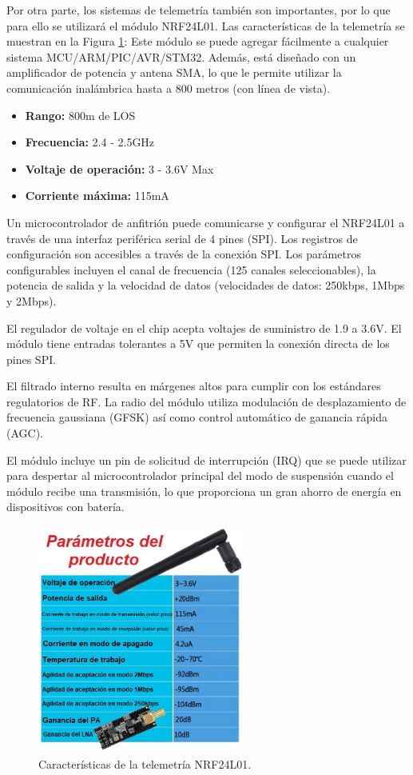 \noindent Por otra parte, los sistemas de telemetría también son importantes, por lo que para ello se utilizará el módulo NRF24L01. Las características de la telemetría se muestran en la Figura \ref{fig:nrf}:
\noindent Este módulo se puede agregar fácilmente a cualquier sistema MCU/ARM/PIC/AVR/STM32. Además, está diseñado con un amplificador de potencia y antena SMA, lo que le permite utilizar la comunicación inalámbrica hasta a 800 metros (con línea de vista).
\begin{itemize}[itemsep=0pt, parsep=0pt, topsep=0pt, partopsep=0pt]
    \item \textbf{Rango:} 800m de LOS
    \item \textbf{Frecuencia:} 2.4 - 2.5GHz
    \item \textbf{Voltaje de operación:} 3 - 3.6V Max
    \item \textbf{Corriente máxima:} 115mA
\end{itemize}

\noindent Un microcontrolador de anfitrión puede comunicarse y configurar el NRF24L01 a través de una interfaz periférica serial de 4 pines (SPI). Los registros de configuración son accesibles a través de la conexión SPI. Los parámetros configurables incluyen el canal de frecuencia (125 canales seleccionables), la potencia de salida y la velocidad de datos (velocidades de datos: 250kbps, 1Mbps y 2Mbps).

\noindent El regulador de voltaje en el chip acepta voltajes de suministro de 1.9 a 3.6V. El módulo tiene entradas tolerantes a 5V que permiten la conexión directa de los pines SPI.

\noindent El filtrado interno resulta en márgenes altos para cumplir con los estándares regulatorios de RF. La radio del módulo utiliza modulación de desplazamiento de frecuencia gaussiana (GFSK) así como control automático de ganancia rápida (AGC).

\noindent El módulo incluye un pin de solicitud de interrupción (IRQ) que se puede utilizar para despertar al microcontrolador principal del modo de suspensión cuando el módulo recibe una transmisión, lo que proporciona un gran ahorro de energía en dispositivos con batería. 

\begin{figure}[H]
    \centering
    \includegraphics[width=0.6\textwidth, height=7.5cm]{imagenes/parametrosNRF.jpg}
    \caption{Características de la telemetría NRF24L01.}
    \label{fig:nrf}
\end{figure}

